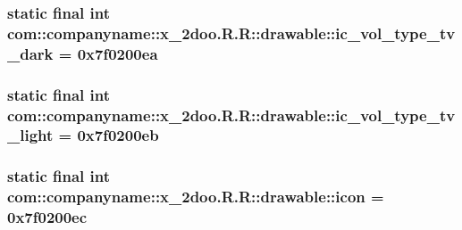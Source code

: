 \hypertarget{classcom_1_1companyname_1_1x__2doo_1_1_r_1_1drawable_85c40cbda1189c592415a972dd366910}{
\subsubsection[{ic\_\-vol\_\-type\_\-tv\_\-dark}]{\setlength{\rightskip}{0pt plus 5cm}static final int com::companyname::x\_\-2doo.R.R::drawable::ic\_\-vol\_\-type\_\-tv\_\-dark = 0x7f0200ea}}
\label{classcom_1_1companyname_1_1x__2doo_1_1_r_1_1drawable_85c40cbda1189c592415a972dd366910}


\hypertarget{classcom_1_1companyname_1_1x__2doo_1_1_r_1_1drawable_1744ed2317941079603fb52658de0126}{
\subsubsection[{ic\_\-vol\_\-type\_\-tv\_\-light}]{\setlength{\rightskip}{0pt plus 5cm}static final int com::companyname::x\_\-2doo.R.R::drawable::ic\_\-vol\_\-type\_\-tv\_\-light = 0x7f0200eb}}
\label{classcom_1_1companyname_1_1x__2doo_1_1_r_1_1drawable_1744ed2317941079603fb52658de0126}


\hypertarget{classcom_1_1companyname_1_1x__2doo_1_1_r_1_1drawable_556413eef0ca7e8b2d3ec877ec5d2b99}{
\subsubsection[{icon}]{\setlength{\rightskip}{0pt plus 5cm}static final int com::companyname::x\_\-2doo.R.R::drawable::icon = 0x7f0200ec}}
\label{classcom_1_1companyname_1_1x__2doo_1_1_r_1_1drawable_556413eef0ca7e8b2d3ec877ec5d2b99}


